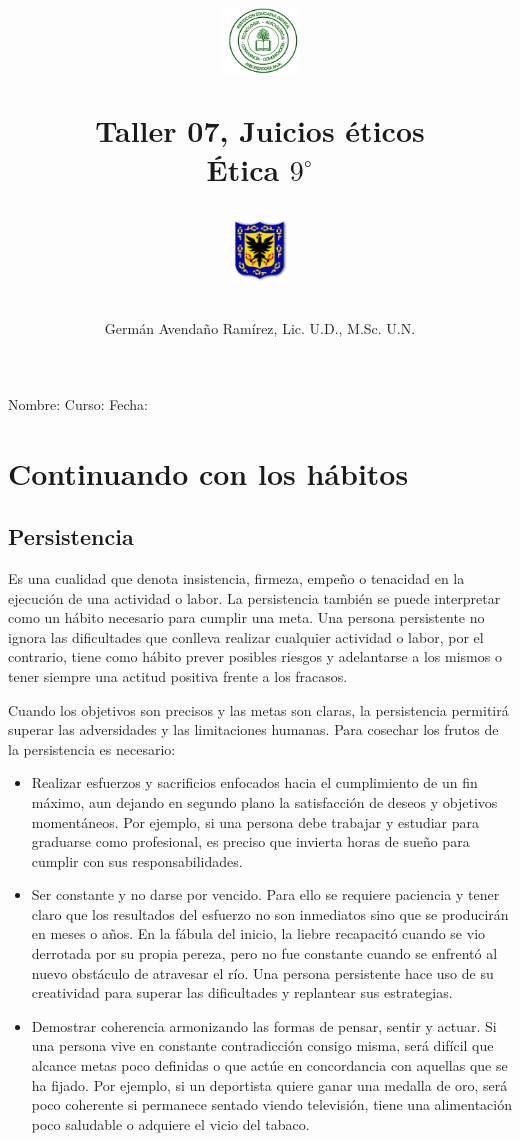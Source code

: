 \documentclass[10pt,twoside]{article}
\author{Germ\'an Avenda\~no Ram\'irez, Lic. U.D., M.Sc. U.N.}
\title{\begin{minipage}{.2\textwidth}
\includegraphics[height=1.75cm]{Images/logo-colegio.png}\end{minipage}
\begin{minipage}{.55\textwidth}
\begin{center}
Taller 07, Juicios éticos \\
Ética $9^{\circ}$
\end{center}
\end{minipage}\hfill
\begin{minipage}{.2\textwidth}
\includegraphics[height=1.75cm]{Images/logo-sed.png} 
\end{minipage}}
\date{}
\begin{document}
\maketitle
Nombre: \hrulefill Curso: \underline{\hspace*{44pt}} Fecha: \underline{\hspace*{2.5cm}}
\section*{Continuando con los hábitos}
\subsection*{Persistencia}
Es una cualidad que denota insistencia, firmeza, empeño o tenacidad en la ejecución de una actividad o labor. La persistencia también se puede interpretar como un hábito necesario para cumplir una meta. Una persona persistente no ignora las dificultades que conlleva realizar cualquier actividad o labor, por el contrario, tiene como hábito prever posibles riesgos y adelantarse a los mismos o tener siempre una actitud positiva frente a los fracasos.

Cuando los objetivos son precisos y las metas son claras, la persistencia permitirá superar las adversidades y las limitaciones humanas. Para cosechar los frutos de la persistencia es necesario:
\begin{itemize}
 \item Realizar esfuerzos y sacrificios enfocados hacia el cumplimiento de un fin máximo, aun dejando en segundo plano la satisfacción de deseos y objetivos momentáneos. Por ejemplo, si una persona debe trabajar y estudiar para graduarse como profesional, es preciso que invierta horas de sueño para cumplir con sus responsabilidades.
\item Ser constante y no darse por vencido. Para ello se requiere paciencia y tener claro que los resultados del esfuerzo no son inmediatos sino que se producirán en meses o años. En la fábula del inicio, la liebre recapacitó cuando se vio derrotada por su propia pereza, pero no fue constante cuando se enfrentó al nuevo obstáculo de atravesar el río. Una persona persistente hace uso de su creatividad para superar las dificultades y replantear sus estrategias.
\item Demostrar coherencia armonizando las formas de pensar, sentir y actuar. Si una persona vive en constante contradicción consigo misma, será difícil que alcance metas poco definidas o que actúe en concordancia con aquellas que se ha fijado. Por ejemplo, si un deportista quiere ganar una medalla de oro, será poco coherente si permanece sentado viendo televisión, tiene una alimentación poco saludable o adquiere el vicio del tabaco.
\end{itemize}
\end{document}
